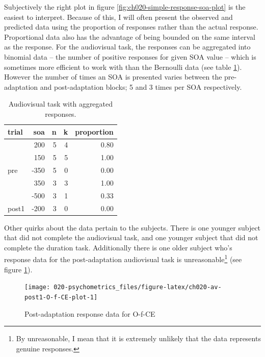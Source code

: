 \documentclass[11pt, oneside, openany]{scrbook}
\begin{document}
Subjectively the right plot in figure \ref{fig:ch020-simple-response-soa-plot} is the easiest to interpret. Because of this, I will often present the observed and predicted data using the proportion of responses rather than the actual response. Proportional data also has the advantage of being bounded on the same interval as the response. For the audiovisual task, the responses can be aggregated into binomial data -- the number of positive responses for given SOA value -- which is sometimes more efficient to work with than the Bernoulli data (see table \ref{tab:ch020-av-bin-sample}). However the number of times an SOA is presented varies between the pre-adaptation and post-adaptation blocks; 5 and 3 times per SOA respectively.

\begin{table}[!h]

\caption{\label{tab:ch020-av-bin-sample}Audiovisual task with aggregated responses.}
\centering
\begin{tabular}[t]{lrrrr}
\toprule
trial & soa & n & k & proportion\\
\midrule
 & 200 & 5 & 4 & 0.80\\
\cmidrule{2-5}
 & 150 & 5 & 5 & 1.00\\
\cmidrule{2-5}
\multirow[t]{-3}{*}{\raggedright\arraybackslash pre} & -350 & 5 & 0 & 0.00\\
\cmidrule{1-5}
 & 350 & 3 & 3 & 1.00\\
\cmidrule{2-5}
 & -500 & 3 & 1 & 0.33\\
\cmidrule{2-5}
\multirow[t]{-3}{*}{\raggedright\arraybackslash post1} & -200 & 3 & 0 & 0.00\\
\bottomrule
\end{tabular}
\end{table}

Other quirks about the data pertain to the subjects. There is one younger subject that did not complete the audiovisual task, and one younger subject that did not complete the duration task. Additionally there is one older subject who's response data for the post-adaptation audiovisual task is unreasonable\footnote{By unreasonable, I mean that it is extremely unlikely that the data represents genuine responses.} (see figure \ref{fig:ch020-av-post1-O-f-CE-plot}).

\begin{figure}

{\centering \texttt{[image: 020-psychometrics\_files/figure-latex/ch020-av-post1-O-f-CE-plot-1]} 

}

\caption{Post-adaptation response data for O-f-CE}\label{fig:ch020-av-post1-O-f-CE-plot}
\end{figure}
\end{document}

